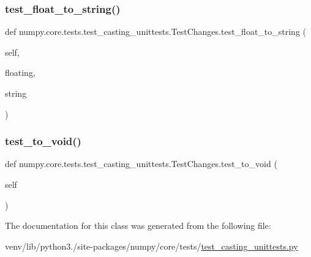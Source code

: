 \subsubsection{\texorpdfstring{test\+\_\+float\+\_\+to\+\_\+string()}{test\_float\_to\_string()}}
{\footnotesize\ttfamily def numpy.\+core.\+tests.\+test\+\_\+casting\+\_\+unittests.\+Test\+Changes.\+test\+\_\+float\+\_\+to\+\_\+string (\begin{DoxyParamCaption}\item[{}]{self,  }\item[{}]{floating,  }\item[{}]{string }\end{DoxyParamCaption})}

\mbox{\label{classnumpy_1_1core_1_1tests_1_1test__casting__unittests_1_1TestChanges_ac6435b49025cf762b931ecbdd03ba774}} 
\subsubsection{\texorpdfstring{test\+\_\+to\+\_\+void()}{test\_to\_void()}}
{\footnotesize\ttfamily def numpy.\+core.\+tests.\+test\+\_\+casting\+\_\+unittests.\+Test\+Changes.\+test\+\_\+to\+\_\+void (\begin{DoxyParamCaption}\item[{}]{self }\end{DoxyParamCaption})}



The documentation for this class was generated from the following file\+:\begin{DoxyCompactItemize}
\item 
venv/lib/python3./site-\/packages/numpy/core/tests/\hyperlink{test__casting__unittests_8py}{test\+\_\+casting\+\_\+unittests.\+py}\end{DoxyCompactItemize}
